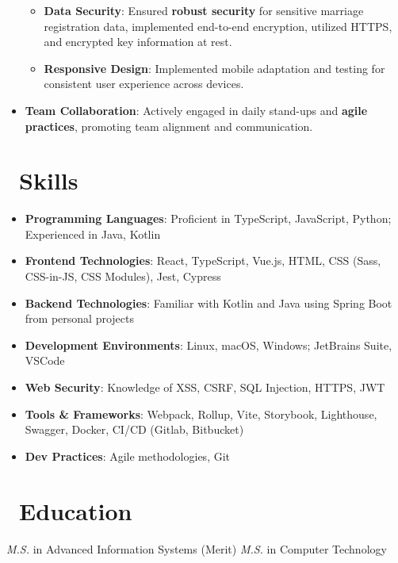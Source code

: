 \documentclass{resume}
\begin{document}
\begin{itemize}
\begin{itemize}
        \item \textbf{Data Security}: Ensured \textbf{robust security} for sensitive marriage registration data, implemented end-to-end encryption, utilized HTTPS, and encrypted key information at rest.
        \item \textbf{Responsive Design}: Implemented mobile adaptation and testing for consistent user experience across devices.
      \end{itemize}
    \item \textbf{Team Collaboration}: Actively engaged in daily stand-ups and \textbf{agile practices}, promoting team alignment and communication.
  \end{itemize}
  

\section{\faCogs\ Skills}
\begin{itemize}[parsep=0.5ex]
  \item \textbf{Programming Languages}: Proficient in TypeScript, JavaScript, Python; Experienced in Java, Kotlin
  \item \textbf{Frontend Technologies}: React, TypeScript, Vue.js, HTML, CSS (Sass, CSS-in-JS, CSS Modules), Jest, Cypress
  \item \textbf{Backend Technologies}: Familiar with Kotlin and Java using Spring Boot from personal projects
  \item \textbf{Development Environments}: Linux, macOS, Windows; JetBrains Suite, VSCode
  \item \textbf{Web Security}: Knowledge of XSS, CSRF, SQL Injection, HTTPS, JWT
  \item \textbf{Tools \& Frameworks}: Webpack, Rollup, Vite, Storybook, Lighthouse, Swagger, Docker, CI/CD (Gitlab, Bitbucket)
  \item \textbf{Dev Practices}: Agile methodologies, Git
\end{itemize}

\section{\faGraduationCap\ Education}
\textit{M.S.} in Advanced Information Systems (Merit)
\textit{M.S.} in Computer Technology
\end{document}
